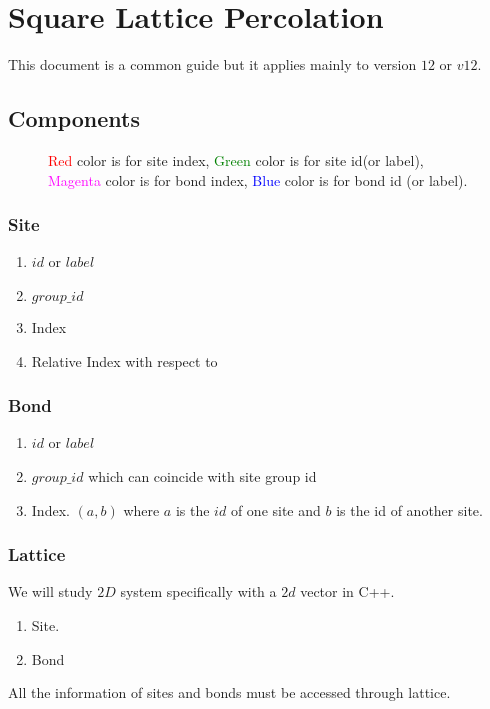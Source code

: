 %

	\chapter{Square Lattice Percolation}
	This document is a common guide but it applies mainly to version $12$ or $v12$.
	
	\section{Components}
	\begin{figure}
		\caption{\textcolor{red}{Red} color is for site index, \textcolor{Green}{Green} color is for site id(or label), \textcolor{magenta}{Magenta} color is for bond index, \textcolor{blue}{Blue} color is for bond id (or label).}
	\end{figure}
	\subsection{Site}
	\begin{enumerate}
		\item $id$ or $label$
		\item $group\_id$
		\item Index
		\item Relative Index with respect to 
	\end{enumerate}
	\subsection{Bond}
\begin{enumerate}
	\item $id$ or $label$
	\item $group\_id$ which can coincide with site group id
	
	\item Index. $(a,b)$ where $a$ is the $id$ of one site and $b$ is the id of another site.
\end{enumerate}
\newpage
	\subsection{Lattice}
	We will study $2D$ system specifically with a $2d$ vector in C++.
	\begin{enumerate}
		\item Site.
		\item Bond
	\end{enumerate}
 All the information of sites and bonds must be accessed through lattice.
	
